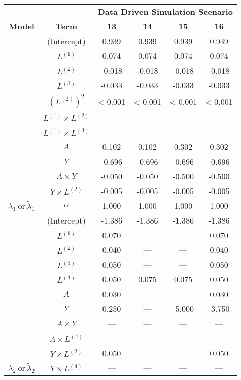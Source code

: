 \begin{table}
\begin{minipage}[t]{0.5\textwidth}
\begin{tabular}[t]{|>{}c|c|c|c|c|>{}c|}
\hline
\multicolumn{1}{|c|}{\textbf{ }} & \multicolumn{1}{|c|}{\textbf{ }} & \multicolumn{4}{|c|}{\textbf{Data Driven Simulation Scenario}} \\
\cline{3-6}
\textbf{Model} & \textbf{Term} & \textbf{13} & \textbf{14} & \textbf{15} & \textbf{16}\\
\hline
 & (Intercept) & 0.939 & 0.939 & 0.939 & 0.939\\
\cline{2-6}
 & $L^{(1)}$ & 0.074 & 0.074 & 0.074 & 0.074\\
\cline{2-6}
 & $L^{(2)}$ & -0.018 & -0.018 & -0.018 & -0.018\\
\cline{2-6}
 & $L^{(3)}$ & -0.033 & -0.033 & -0.033 & -0.033\\
\cline{2-6}
 & $(L^{(2)})^2$ & < 0.001 & < 0.001 & < 0.001 & < 0.001\\
\cline{2-6}
 & $L^{(1)} \times L^{(2)}$ & --- & --- & --- & ---\\
\cline{2-6}
 & $L^{(1)} \times L^{(3)}$ & --- & --- & --- & ---\\
\cline{2-6}
 & $A$ & 0.102 & 0.102 & 0.302 & 0.302\\
\cline{2-6}
 & $Y$ & -0.696 & -0.696 & -0.696 & -0.696\\
\cline{2-6}
 & $A\times Y$ & -0.050 & -0.050 & -0.500 & -0.500\\
\cline{2-6}
 & $Y \times L^{(2)}$ & -0.005 & -0.005 & -0.005 & -0.005\\
\cline{2-6}
\multirow{-12}{*}{\centering\arraybackslash $\lambda_1~\text{or}~\tilde\lambda_1$} & $\alpha$ & 1.000 & 1.000 & 1.000 & 1.000\\
\cline{1-6}
 & (Intercept) & -1.386 & -1.386 & -1.386 & -1.386\\
\cline{2-6}
 & $L^{(1)}$ & 0.070 & --- & --- & 0.070\\
\cline{2-6}
 & $L^{(2)}$ & 0.040 & --- & --- & 0.040\\
\cline{2-6}
 & $L^{(3)}$ & 0.050 & --- & --- & 0.050\\
\cline{2-6}
 & $L^{(4)}$ & 0.050 & 0.075 & 0.075 & 0.050\\
\cline{2-6}
 & $A$ & 0.030 & --- & --- & 0.030\\
\cline{2-6}
 & $Y$ & 0.250 & --- & -5.000 & -3.750\\
\cline{2-6}
 & $A\times Y$ & --- & --- & --- & ---\\
\cline{2-6}
 & $A \times L^{(4)}$ & --- & --- & --- & ---\\
\cline{2-6}
 & $Y \times L^{(2)}$ & 0.050 & --- & --- & 0.050\\
\cline{2-6}
\multirow{-11}{*}{\centering\arraybackslash $\lambda_2~\text{or}~\tilde\lambda_2$} & $Y \times L^{(4)}$ & --- & --- & --- & ---\\
\hline
\end{tabular}
\end{minipage}
\end{table}



